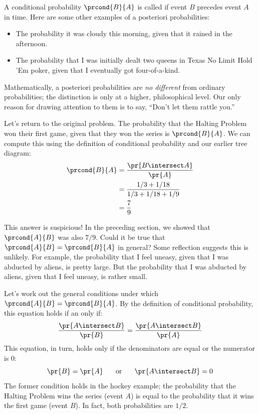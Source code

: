 A conditional probability $\prcond{B}{A}$ is called   if event $B$ precedes event $A$ in time.  Here are some
other examples of a posteriori probabilities:
%
\begin{itemize}
\item The probability it was cloudy this morning, given that it rained
in the afternoon.
\item The probability that I was initially dealt two queens in Texas
No Limit Hold 'Em poker, given that I eventually got four-of-a-kind.
\end{itemize}
%
Mathematically, a posteriori probabilities are \textit{no different}
from ordinary probabilities; the distinction is only at a higher,
philosophical level.  Our only reason for drawing attention to them is
to say, ``Don't let them rattle you.''

Let's return to the original problem.  The probability that the
Halting Problem won their first game, given that they won the series
is $\prcond{B}{A}$.  We can compute this using the definition of
conditional probability and our earlier tree diagram:
%
\begin{align*}
\prcond{B}{A} & = \frac{\pr{B \intersect A}}{\pr{A}} \\
              & = \frac{1/3 + 1/18}{1/3 + 1/18 + 1/9} \\
              & = \frac{7}{9}
\end{align*}

This answer is suspicious!  In the preceding section, we showed that
$\prcond{A}{B}$ was also $7/9$.  Could it be true that $\prcond{A}{B}
= \prcond{B}{A}$ in general?  Some reflection suggests this is
unlikely.  For example, the probability that I feel uneasy, given that
I was abducted by aliens, is pretty large.  But the probability that I
was abducted by aliens, given that I feel uneasy, is rather small.

Let's work out the general conditions under which $\prcond{A}{B} =
\prcond{B}{A}$.  By the definition of conditional probability, this
equation holds if an only if:
%
\[
\frac{\pr{A \intersect B}}{\pr{B}} = \frac{\pr{A \intersect B}}{\pr{A}}
\]
%
This equation, in turn, holds only if the denominators are equal or
the numerator is 0:
%
\[
\pr{B} = \pr{A}
\hspace{0.25in} \text{or} \hspace{0.25in}
\pr{A \intersect B} = 0
\]
%
The former condition holds in the hockey example; the probability that
the Halting Problem wins the series (event $A$) is equal to the
probability that it wins the first game (event $B$).  In fact, both
probabilities are $1/2$.

